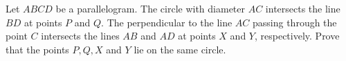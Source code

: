 Let $ABCD$ be a parallelogram. The circle with diameter $AC$ intersects the line $BD$ at points $P$ and $Q$. The perpendicular to the line $AC$ passing through the point $C$ intersects the lines $AB$ and $AD$ at points $X$ and $Y$,  respectively. Prove that the points $P,Q,X$ and $Y$ lie on the same circle.